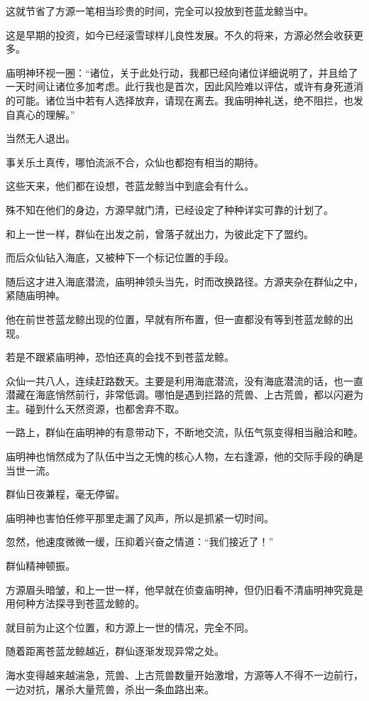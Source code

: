 \begin{this_body}
这就节省了方源一笔相当珍贵的时间，完全可以投放到苍蓝龙鲸当中。

这是早期的投资，如今已经滚雪球样儿良性发展。不久的将来，方源必然会收获更多。

庙明神环视一圈：“诸位，关于此处行动，我都已经向诸位详细说明了，并且给了一天时间让诸位多加考虑。此行我也是首次，因此风险难以评估，或许有身死道消的可能。诸位当中若有人选择放弃，请现在离去。我庙明神礼送，绝不阻拦，也发自真心的理解。”

当然无人退出。

事关乐土真传，哪怕流派不合，众仙也都抱有相当的期待。

这些天来，他们都在设想，苍蓝龙鲸当中到底会有什么。

殊不知在他们的身边，方源早就门清，已经设定了种种详实可靠的计划了。

和上一世一样，群仙在出发之前，曾落子就出力，为彼此定下了盟约。

而后众仙钻入海底，又被种下一个标记位置的手段。

随后这才进入海底潜流，庙明神领头当先，时而改换路径。方源夹杂在群仙之中，紧随庙明神。

他在前世苍蓝龙鲸出现的位置，早就有所布置，但一直都没有等到苍蓝龙鲸的出现。

若是不跟紧庙明神，恐怕还真的会找不到苍蓝龙鲸。

众仙一共八人，连续赶路数天。主要是利用海底潜流，没有海底潜流的话，也一直潜藏在海底悄然前行，非常低调。哪怕是遇到拦路的荒兽、上古荒兽，都以闪避为主。碰到什么天然资源，也都舍弃不取。

一路上，群仙在庙明神的有意带动下，不断地交流，队伍气氛变得相当融洽和睦。

庙明神也悄然成为了队伍中当之无愧的核心人物，左右逢源，他的交际手段的确是当世一流。

群仙日夜兼程，毫无停留。

庙明神也害怕任修平那里走漏了风声，所以是抓紧一切时间。

忽然，他速度微微一缓，压抑着兴奋之情道：“我们接近了！”

群仙精神顿振。

方源眉头暗皱，和上一世一样，他早就在侦查庙明神，但仍旧看不清庙明神究竟是用何种方法探寻到苍蓝龙鲸的。

就目前为止这个位置，和方源上一世的情况，完全不同。

随着距离苍蓝龙鲸越近，群仙逐渐发现异常之处。

海水变得越来越湍急，荒兽、上古荒兽数量开始激增，方源等人不得不一边前行，一边对抗，屠杀大量荒兽，杀出一条血路出来。


\end{this_body}
